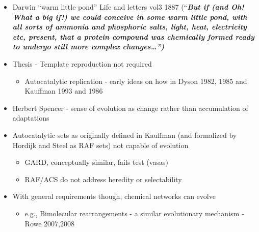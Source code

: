 		\begin{itemize}
			\item
			
			Darwin ``warm little pond'' Life and letters vol3 1887
			(``\emph{\textbf{But if (and Oh! What a big if!) we could conceive in
					some warm little pond, with all sorts of ammonia and phosphoric salts,
					light, heat, electricity etc, present, that a protein compound was
					chemically formed ready to undergo still more complex
					changes\ldots{}'')}}
			
			\item
			
			Thesis - Template reproduction not required
			
			
			\begin{itemize}
				\item
				
				Autocatalytic replication - early ideas on how in Dyson 1982, 1985
				and Kauffman 1993 and 1986
				
			\end{itemize}
			\item
			
			Herbert Spencer - sense of evolution as change rather than
			accumulation of adaptations
			
			\item
			
			Autocatalytic sets as originally defined in Kauffman (and formalized
			by Hordijk and Steel as RAF sets) not capable of evolution
			
			
			\begin{itemize}
				\item
				
				GARD, conceptually similar, fails test (vasas)
				
				\item
				
				RAF/ACS do not address heredity or selectability
				
			\end{itemize}
			\item
			
			With general requirements though, chemical networks can evolve
			
			
			\begin{itemize}
				\item
				
				e.g., Bimolecular rearrangements - a similar evolutionary mechanism
				- Rowe 2007,2008
				

\end{itemize}
\end{itemize}
